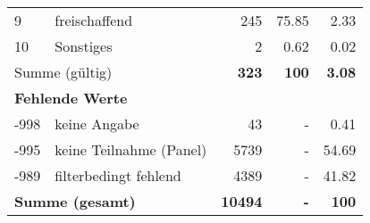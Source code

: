 \begin{longtable}{lXrrr}
     9 &
     \multicolumn{1}{X}{ freischaffend   } &


       \num{245} &
       \num[round-mode=places,round-precision=2]{75.85} &
         \num[round-mode=places,round-precision=2]{2.33} \\

     10 &
     \multicolumn{1}{X}{ Sonstiges   } &


       \num{2} &
       \num[round-mode=places,round-precision=2]{0.62} &
         \num[round-mode=places,round-precision=2]{0.02} \\
     \midrule
     \multicolumn{2}{l}{Summe (gültig)} &
       \textbf{\num{323}} &
     \textbf{\num{100}} &
       \textbf{\num[round-mode=places,round-precision=2]{3.08}} \\
     \multicolumn{5}{l}{\textbf{Fehlende Werte}}\\
       -998 &
       keine Angabe &
         \num{43} &
        - &
         \num[round-mode=places,round-precision=2]{0.41} \\
       -995 &
       keine Teilnahme (Panel) &
         \num{5739} &
        - &
         \num[round-mode=places,round-precision=2]{54.69} \\
       -989 &
       filterbedingt fehlend &
         \num{4389} &
        - &
         \num[round-mode=places,round-precision=2]{41.82} \\
     \midrule
     \multicolumn{2}{l}{\textbf{Summe (gesamt)}} &
          \textbf{\num{10494}} &
        \textbf{-} &
        \textbf{\num{100}} \\
     \bottomrule
     \end{longtable}
     
